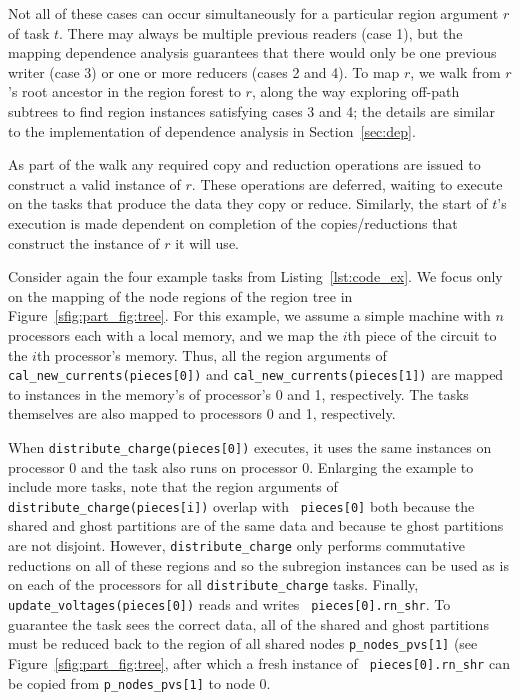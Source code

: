 Not all of these cases can occur simultaneously for a particular
region argument $r$ of task $t$.  There may always be multiple
previous readers (case 1), but the mapping dependence analysis
guarantees that there would only be one previous writer (case 3) or
one or more reducers (cases 2 and 4).  To map $r$, we walk from $r$'s
root ancestor in the region forest to $r$, along the way exploring
off-path subtrees to find region instances satisfying cases 3 and
4; the details are similar to the implementation of dependence
analysis in Section~\ref{sec:dep}.  

As part of the walk any required copy and reduction operations are
issued to construct a valid instance of $r$.  These operations are
deferred, waiting to execute on the tasks that produce the data they
copy or reduce. Similarly, the start of $t$'s execution is made
dependent on completion of the copies/reductions that construct the
instance of $r$ it will use.

%
%
Consider again the four example tasks from Listing~\ref{lst:code_ex}.
We focus only on the mapping of the node regions of the region tree in
Figure~\ref{sfig:part_fig:tree}.  For this example, we assume a simple 
machine with $n$ processors each with a local memory, and we map the $i$th
piece of the circuit to the $i$th processor's memory.  Thus, all the
region arguments of 
{\tt cal\_new\_currents(pieces[0])}
and
{\tt cal\_new\_currents(pieces[1])}
are mapped to instances in the memory's of processor's 0 and 1, respectively.  The tasks themselves
are also mapped to processors 0 and 1, respectively.

When {\tt distribute\_charge(pieces[0])} executes, it uses the same
instances on processor 0 and the task also runs on processor 0.
Enlarging the example to include more tasks, note that the region
arguments of {\tt distribute\_charge(pieces[i])} overlap with {\tt
  pieces[0]} both because the shared and ghost partitions are of the
same data and because te ghost partitions are not disjoint.  However,
{\tt distribute\_charge} only performs commutative reductions on all
of these regions and so the subregion instances can be used as is on
each of the processors for all {\tt distribute\_charge} tasks.
Finally, {\tt update\_voltages(pieces[0])} reads and writes {\tt
  pieces[0].rn\_shr}.  To guarantee the task sees the correct data,
all of the shared and ghost partitions must be reduced back to the
region of all shared nodes {\tt p\_nodes\_pvs[1]} (see
Figure~\ref{sfig:part_fig:tree}, after which a fresh instance of {\tt
  pieces[0].rn\_shr} can be copied from {\tt p\_nodes\_pvs[1]} to node
0.

